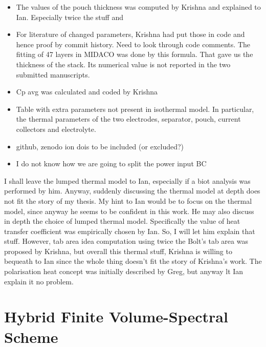\begin{itemize}
    \item The values of the pouch thickness was computed by Krishna and explained to Ian. Especially twice the stuff and
    \item For literature of changed parameters, Krishna had put those in code and hence proof by commit history. Need to look through code comments. The fitting of 47 layers in MIDACO was done by this formula. That gave us the thickness of the stack. Its numerical value is not reported in the two submitted manuscripts.
    \item Cp avg was calculated and coded by Krishna
    \item Table with extra parameters not present in isothermal model. In particular, the thermal parameters of the two electrodes, separator, pouch, current collectors and electrolyte.
    \item github, zenodo ion dois to be included (or excluded?)
    \item I do not know how we are going to split the power input BC
\end{itemize}

I shall leave the lumped thermal model to Ian, especially if a biot analysis was
performed by  him. Anyway, suddenly discussing  the thermal model at  depth does
not fit the story of my thesis. My hint  to Ian would be to focus on the thermal
model, since anyway he  seems to be confident in this work.  He may also discuss
in depth  the choice  of lumped  thermal model. Specifically  the value  of heat
transfer coefficient was  empirically chosen by Ian. So, I  will let him explain
that stuff. However,  tab area idea computation using twice  the Bolt's tab area
was proposed by  Krishna, but overall this thermal stuff,  Krishna is willing to
bequeath to Ian since  the whole thing doesn't fit the  story of Krishna's work.
The polarisation heat concept was initially described by Greg, but anyway lt Ian
explain it no problem.



\section{Hybrid Finite Volume-Spectral Scheme}\label{sec:hybrid fv-spectral}

